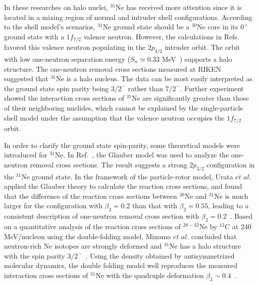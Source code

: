 \documentclass[twocolumn,prc,showpacs,preprintnumbers,superscriptaddress,floatfix]{revtex4}
\begin{document}
In these researches on halo nuclei, $^{31}$Ne has received more attention
since it is located in a mixing region of normal and intruder shell
configurations. According to the shell model's scenarios, $^{31}$Ne ground
state should be a $^{30}$Ne core in its $0^{+}$ ground state with a $%
1f_{7/2} $ valence neutron. However, the calculations in Refs.~\cite%
{Poves1994,Descouvemont1999} favored this valence neutron populating in the $%
2p_{3/2}$ intruder orbit. The orbit with low one-neutron separation energy ($%
S_{n}\simeq 0.33$ MeV~\cite{Audi2003}) supports a halo structure. The
one-neutron removal cross sections measured at RIKEN~\cite{Nakamura2009}
suggested that $^{31}$Ne is a halo nucleus. The data can be most easily
interpreted as the ground state spin parity being $3/2^{-}$ rather than $%
7/2^{-}$. Further experiment~\cite{Takechi2012} showed the interaction cross
sections of $^{31}$Ne are significantly greater than those of their
neighboring nuclides, which cannot be explained by the single-particle shell
model under the assumption that the valence neutron occupies the $1f_{7/2}$
orbit.

In order to clarify the ground state spin-parity, some theoretical models
were introduced for $^{31}$Ne. In Ref.~\cite{Horiuchi2010}, the Glauber
model was used to analyze the one-neutron removal cross sections. The result
suggests a strong $2p_{3/2}$ configuration in the $^{31}$Ne ground state. In
the framework of the particle-rotor model, Urata $et$ $al.$ applied the
Glauber theory to calculate the reaction cross sections, and found that the
difference of the reaction cross sections between $^{30}$Ne and $^{31}$Ne is
much larger for the configuration with $\beta _{2}=0.2$ than that with $%
\beta _{2}=0.55$, leading to a consistent description of one-neutron removal
cross section with $\beta _{2}=0.2$~\cite{Urata2011,Urata2012}. Based on a
quantitative analysis of the reaction cross sections of $^{28-32}$Ne by $%
^{12}$C at 240 MeV/nucleon using the double-folding model, Minomo $et$ $al$.
concluded that neutron-rich Ne isotopes are strongly deformed and $^{31}$Ne
has a halo structure with the spin parity $3/2^{-}$~\cite%
{Minomo2011,Minomo2012}. Using the density obtained by antisymmetrized
molecular dynamics, the double folding model well reproduces the measured
interaction cross sections of $^{31}$Ne with the quadruple deformation $%
\beta_2\sim 0.4$~\cite{Sumi2012}.
\end{document}
